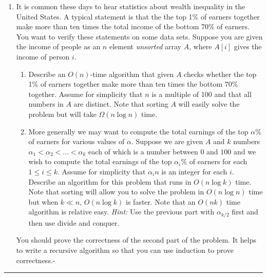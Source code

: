 \documentclass[11pt]{article}
\begin{document}


\begin{enumerate}[3.]
\item It is common these days to hear statistics about wealth inequality in
the United States. A typical statement is that the the top 1\% of
earners together make more than ten times the total income of the bottom
70\% of earners. You want to verify these statements on some data
sets. Suppose you are given the income of people as an $n$ element
\emph{unsorted} array $A$, where $A[i]$ gives the income of person
$i$.
\begin{enumerate}
\item Describe an $O(n)$-time algorithm that given $A$ checks whether
  the top 1\% of earners together make more than ten times the bottom
  70\% together. Assume for simplicity that $n$ is a multiple of 100
  and that all numbers in $A$ are distinct. Note that sorting $A$ will
  easily solve the problem but will take $\Omega(n\log n)$ time.
\item More generally we may want to compute the total earnings of the
  top $\alpha$\% of earners for various values of $\alpha$. Suppose we
  are given $A$ and $k$ numbers $\alpha_1 < \alpha_2 < \ldots < \alpha_k$
  each of which is a number between $0$ and $100$ and we wish to
  compute the total earnings of the top $\alpha_i$\% of earners for
  each $1 \le i \le k$. Assume for simplicity that $\alpha_i n$ is an
  integer for each $i$. Describe an algorithm for this problem that
  runs in $O(n \log k)$ time. Note that sorting will allow you to
  solve the problem in $O(n \log n)$ time but when $k \ll n$, $O(n
  \log k)$ is faster. Note that an $O(nk)$ time algorithm is relative
  easy. {\em Hint:} Use the previous part with $\alpha_{k/2}$ first and then
  use divide and conquer.
\end{enumerate}

You should prove the correctness of the second part of the problem.
It helps to write a recursive algorithm so that you can use induction
to prove correctness.-
\end{enumerate}

\hrule
\end{document}
